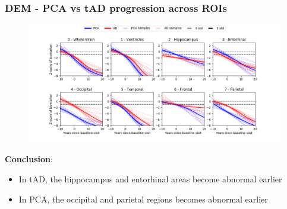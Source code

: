 \documentclass[10pt,xcolor=table]{beamer}
\begin{document}
% 
% 

% 
% 
% 
% 

\begin{frame}
\frametitle{DEM - PCA vs tAD progression across ROIs}


\begin{figure}
 \hspace{-1cm}
 \includegraphics[scale=0.33, trim=0 0 0 30,clip=true]{../images/dem/mriSmallSebPaper_DEMStd_subplotsPcaAd.png}
 \label{trajDEMPcaAd}
\end{figure}

\textbf{Conclusion}: 
\begin{itemize}
 \item In tAD, the hippocampus and entorhinal areas become abnormal earlier
 \item In PCA, the occipital and parietal regions becomes abnormal earlier
\end{itemize}


\end{frame}
\end{document}
